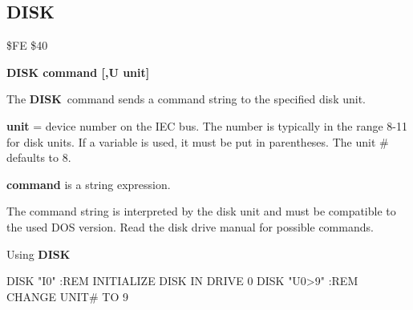 \subsection{DISK}
\begin{description}[leftmargin=3cm,style=nextline]
\item [Token:] \$FE \$40
\item [Format:] {\bf DISK command [,U unit] }
\item [Usage:]
   The {\bf DISK} command sends a command string to the
   specified disk unit.

   {\bf unit} = device number on the IEC bus.
   The number is typically in the range 8-11 for disk units.
   If a variable is used, it must be put in parentheses.
   The unit \# defaults to 8.

   {\bf command} is a string expression.

\item [Remarks:]
   The command string is interpreted by the disk unit
   and must be compatible to the used DOS version.
   Read the disk drive manual for possible commands.

\item [Example:] Using {\bf DISK}
\begin{screenoutput}
  DISK "I0"   :REM INITIALIZE DISK IN DRIVE 0
  DISK "U0>9" :REM CHANGE UNIT# TO 9
\end{screenoutput}
\end{description}


\newpage
